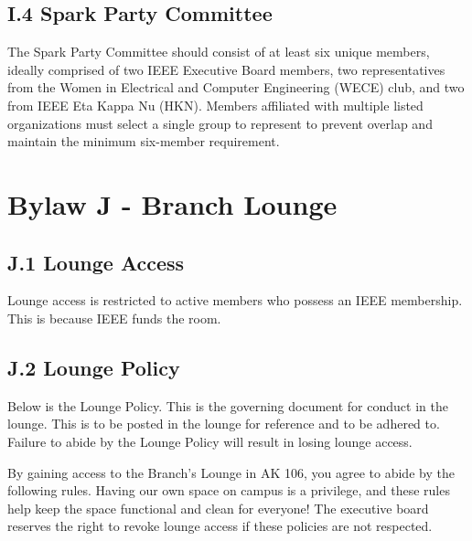 \documentclass[11pt,a4paper]{article}
\begin{document}
\subsection*{I.4 Spark Party Committee}

The Spark Party Committee should consist of at least six unique members, ideally comprised of two IEEE Executive Board members, two representatives from the Women in Electrical and Computer Engineering (WECE) club, and two from IEEE Eta Kappa Nu (HKN). Members affiliated with multiple listed organizations must select a single group to represent to prevent overlap and maintain the minimum six-member requirement.

\section*{Bylaw J - Branch Lounge}

\subsection*{J.1 Lounge Access}
Lounge access is restricted to active members who possess an IEEE membership. This is because IEEE funds the room.

\subsection*{J.2 Lounge Policy}
Below is the Lounge Policy. This is the governing document for conduct in the lounge. This is to be posted in the lounge for reference and to be adhered to. Failure to abide by the Lounge Policy will result in losing lounge access.\newline

By gaining access to the Branch's Lounge in AK 106, you agree to abide by the following rules. Having our own space on campus is a privilege, and these rules help keep the space functional and clean for everyone! The executive board reserves the right to revoke lounge access if these policies are not respected.
\end{document}
